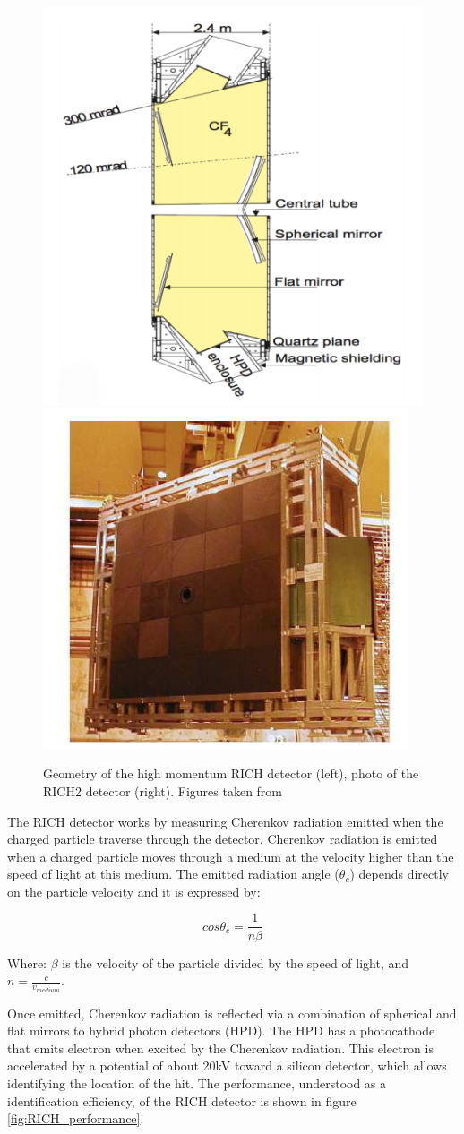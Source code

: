 \begin{figure}[h]
 \begin{center}
  \includegraphics[width=0.49\linewidth]{figures/RICH2.PNG}
   \includegraphics[width=0.49\linewidth]{figures/RICH2_photo.PNG}
    \caption{Geometry of the high momentum RICH detector (left), photo of the RICH2 detector (right). Figures taken from \cite{lhcb}}%
    \label{fig:RICH2}%
 \end{center}
\end{figure}


The RICH detector works by measuring Cherenkov radiation emitted when the charged particle traverse through the detector. Cherenkov radiation is emitted when a charged particle moves through a medium at the velocity higher than the speed of light at this medium. The emitted radiation angle ($\theta_c$) depends directly on the particle velocity and it is expressed by:

\begin{equation}
cos \theta_c = \frac{1}{n\beta}
\end{equation}

Where: $\beta$ is the velocity of the particle divided by the speed of light, and $n = \frac{c}{v_{medium}}$. 

Once emitted, Cherenkov radiation is reflected via a combination of spherical and flat mirrors to hybrid photon detectors (HPD). The HPD has a photocathode that emits electron when excited by the Cherenkov radiation. This electron is accelerated by a potential of about 20kV toward a silicon detector, which allows identifying the location of the hit. The performance, understood as a identification efficiency, of the RICH detector is shown in figure \ref{fig:RICH_performance}. 


